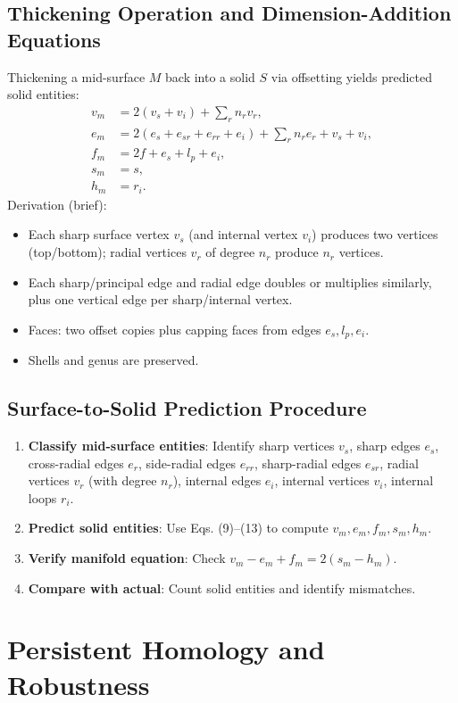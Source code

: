 \documentclass[conference]{IEEEtran}
\begin{document}
\subsection{Thickening Operation and Dimension-Addition Equations}
Thickening a mid-surface $M$ back into a solid $S$ via offsetting yields predicted solid entities:
\begin{align}
v_m &= 2(v_s + v_i) + \sum_r n_r v_r, \\
e_m &= 2(e_s + e_{sr} + e_{rr} + e_i) + \sum_r n_r e_r + v_s + v_i, \\
f_m &= 2f + e_s + l_p + e_i, \\
s_m &= s, \\
h_m &= r_i.
\end{align}
Derivation (brief):
\begin{itemize}
\item Each sharp surface vertex $v_s$ (and internal vertex $v_i$) produces two vertices (top/bottom); radial vertices $v_r$ of degree $n_r$ produce $n_r$ vertices.
\item Each sharp/principal edge and radial edge doubles or multiplies similarly, plus one vertical edge per sharp/internal vertex.
\item Faces: two offset copies plus capping faces from edges $e_s, l_p, e_i$.
\item Shells and genus are preserved.
\end{itemize} \subsection{Surface-to-Solid Prediction Procedure}
\begin{enumerate}
\item \textbf{Classify mid-surface entities}: Identify sharp vertices $v_s$, sharp edges $e_s$, cross-radial edges $e_r$, side-radial edges $e_{rr}$, sharp-radial edges $e_{sr}$, radial vertices $v_r$ (with degree $n_r$), internal edges $e_i$, internal vertices $v_i$, internal loops $r_i$.
\item \textbf{Predict solid entities}: Use Eqs. (9)--(13) to compute $v_m,e_m,f_m,s_m,h_m$.
\item \textbf{Verify manifold equation}: Check $v_m - e_m + f_m = 2(s_m - h_m)$.
\item \textbf{Compare with actual}: Count solid entities and identify mismatches.
\end{enumerate} \section{Persistent Homology and Robustness}
\end{document}
